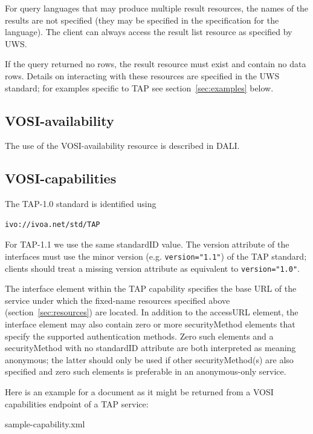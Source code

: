 \documentclass[11pt,letter]{ivoa}
\begin{document}
For query languages that may produce multiple result resources, the names of the 
results are not specified (they may be specified in the specification for the 
language). The client can always access the result list resource as specified by 
UWS.

If the query returned no rows, the result resource must exist and contain no 
data rows. Details on interacting with these resources are specified in the UWS 
standard; for examples specific to TAP see section~\ref{sec:examples} below.

\subsection{VOSI-availability}
\label{sec:vosi-availability}

The use of the VOSI-availability resource is described in DALI.

\subsection{VOSI-capabilities}
\label{sec:vosi-capabilities}

The TAP-1.0 standard is identified using 
\begin{verbatim}
ivo://ivoa.net/std/TAP
\end{verbatim}

For TAP-1.1 we use the same standardID value. The version attribute of the interfaces 
must use the minor version (e.g. \verb|version="1.1"|) of the TAP standard; clients 
should treat a missing version attribute as equivalent to \verb|version="1.0"|.

The interface element within the TAP capability specifies the base URL of the service 
under which the fixed-name resources specified above (section~\ref{sec:resources}) are located.
In addition to the accessURL element, the interface element may also contain zero or more securityMethod 
elements that specify the supported authentication methods. Zero such elements and a securityMethod with no standardID attribute are both interpreted as meaning anonymous; the latter should only be used if other securityMethod(s) are also specified and zero such elements is preferable in an anonymous-only service.

Here is an example for a document as it might be returned from a VOSI
capabilities endpoint of a TAP service:


  {sample-capability.xml}
\end{document}
